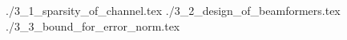 \startchapter [title={Error analysis}]

 {./3_1_sparsity_of_channel.tex}
 {./3_2_design_of_beamformers.tex}
 {./3_3_bound_for_error_norm.tex}

\stopchapter
